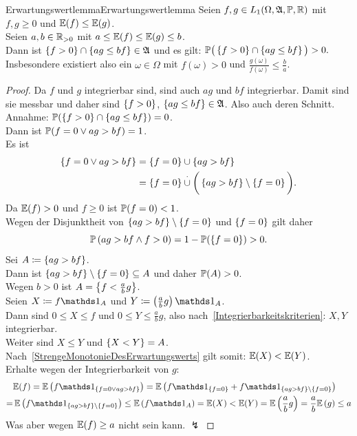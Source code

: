 \begin{lemma}{Erwartungswertlemma}{Erwartungswertlemma}
Seien $f,g\in L_1(\Omega,\mathfrak{A},\mathbb{P},\mathbb{R})$ mit $f,g\ge 0$ und $\mathbb{E}(f)\le\mathbb{E}(g)$.\\
Seien $a, b \in \mathbb{R}_{>0}$ mit $a \le \mathbb{E}(f) \le \mathbb{E}(g) \le b$.\\
Dann ist $\left\{f > 0\right\}\cap \left\{ag \le bf\right\} \in \mathfrak{A}$ und es gilt:
$\mathbb{P}\big(\left\{f > 0\right\}\cap \left\{ag \le bf\right\}\big) > 0\text.$\\
Insbesondere existiert also ein $\omega \in \Omega$ mit $f(\omega) > 0$ und
$\frac {g(\omega)}{f(\omega)} \le \frac b a$.
\end{lemma}
\begin{proof}
Da $f$ und $g$ integrierbar sind, sind auch $ag$ und $bf$ integrierbar. Damit
sind sie messbar und daher sind $\left\{f >0\right\}$,
$\left\{ag \le bf\right\} \in \mathfrak{A}$. Also auch deren Schnitt.\\
Annahme: $\mathbb{P}(\left\{f > 0\right\}\cap \left\{ag \le bf\right\}) = 0$.\\
Dann ist $\mathbb{P}(f = 0 \vee ag > bf) = 1$.\\
Es ist 
\begin{align*}\left\{f = 0 \vee ag > bf\right\} &= \left\{f=0\right\} \cup \left\{ag > bf\right\} \\
&= \left\{f=0\right\} \overset{\cdot}\cup \bigg(\left\{ag>bf\right\}\setminus\left\{f=0\right\}
\bigg)\text.\end{align*}
Da $\mathbb{E}(f) > 0$ und $f \ge 0$ ist $\mathbb{P}(f = 0) < 1$.\\
Wegen der Disjunktheit von $\left\{ag >bf\right\}\setminus\left\{f=0\right\}$ und $\left\{f=0\right\}$
gilt daher
\[\mathbb{P}\left(ag > bf \wedge f > 0 \right) = 1 - \mathbb{P}(\left\{f= 0\right\}) > 0\text.\]
Sei $A \coloneqq  \left\{ag>bf\right\}$.\\
Dann ist $\left\{ag>bf\right\}\setminus\left\{f=0\right\}\subseteq A$ und daher $\mathbb{P}(A)>0$.\\
Wegen $b>0$ ist $A = \left\{f < \frac a b g\right\}$.\\
Seien $X \coloneqq  f \Eins_A$ und $Y\coloneqq  \left(\frac a b g\right) \Eins_A$.\\
Dann sind $0 \le X \le f$ und $0 \le Y \le \frac a b g$, also nach~\ref{Integrierbarkeitskriterien}: $X, Y$ integrierbar.\\
Weiter sind $X \le Y$ und $\left\{X < Y\right\} = A$.\\
Nach~\ref{StrengeMonotonieDesErwartungswerts} gilt somit: $\mathbb{E}(X) < \mathbb{E}(Y)$.\\
Erhalte wegen der Integrierbarkeit von $g$:
\begin{align*}
& \E(f) = \E\left(f\Eins_{\meng{f = 0 \vee ag > bf}}\right) 
= \E\left(f\Eins_{\meng{f=0}} +f\Eins_{\meng{ag > bf}\setminus\meng{f=0}}\right)\\
=&\, \E\left(f\Eins_{\meng{ag > bf}\setminus\meng{f=0}} \right) 
\le \E\left(f\Eins_A \right)= \E(X) < \E(Y) = \E\left(\frac abg \right)
=\frac a b \E\left(g\right) \le a
\end{align*}
Was aber wegen $\mathbb{E}(f) \ge a$ nicht sein kann. $\lightning$
\end{proof}